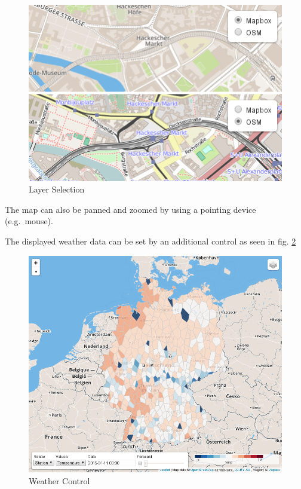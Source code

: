 \documentclass[paper=a4, fontsize=11pt]{scrartcl} %
\numberwithin{equation}{section} %
\numberwithin{figure}{section} %
\numberwithin{table}{section} %
\begin{document}
\begin{figure}[htbp]
\includegraphics[width=1\textwidth]{pictures/screenshot-baselayer.png}
\caption{Layer Selection}
\label{fig:layer-selection}
\end{figure}

\newpage
The map can also be panned and zoomed by using a pointing device
(e.g.~mouse).

The displayed weather data can be set by an additional control as seen
in fig. \ref{fig:weather-control}

\begin{figure}[htbp]
\includegraphics[width=1\textwidth]{pictures/screenshot-control.png}
\caption{Weather Control}
\label{fig:weather-control}
\end{figure}
\end{document}
